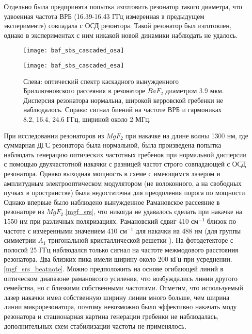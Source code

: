 Отдельно была предпринята попытка изготовить резонатор такого диаметра, что удвоенная частота ВРБ (16.39-16.43 ГГц измеренная в предыдущем эксперименте) совпадала с ОСД резонтора. Такой резонатор был изготовлен, однако в экспериментах с ним никакой новой динамики наблюдать не удалось.

\begin{figure}[ht]
\begin{minipage}[ht]{0.49\linewidth}\centering
    \texttt{[image: baf\_sbs\_cascaded\_osa]}
  \end{minipage}
  \hfill
  \begin{minipage}[ht]{0.49\linewidth}\centering
    \texttt{[image: baf\_sbs\_cascaded\_esa]}
  \end{minipage}
    \caption{Слева: оптический спектр каскадного вынужденного Бриллюэновского рассеяния в резонаторе $BaF_2$ диаметром 3.9 мкм. Дисперсия резонатора нормальна, широкой керровской гребенки не наблюдалось. Справа: сигнал биений на частоте ВРБ и гармониках 8.2, 16.4, 24.6 ГГц, шириной около 2 МГц.}
  \label{baf_sbs}
\end{figure}

При исследовании резонаторов из $MgF_2$ при накачке на длине волны 1300 нм, где суммарная ДГС резонатора была нормальной, была произведена попытка наблюдать генерацию оптических частотных гребенок при нормальной дисперсии с помощью двухчастотной накачки с разницей частот строго совпадающей с ОСД резонатора. Однако выходная мощность в схеме с имеющимся лазером и амплитудным электрооптическом модулятором (не волоконного, а на свободных пучках в пространстве) была недостаточна для преодоления порога по мощности. Однако впервые было наблюдено вынужденное Рамановское рассеяние в резонаторе из $MgF_2$ \ref{mgf_srs}, что никогда не удавалось сделать при накачке на 1550 нм при различных поляризациях. Рамановский сдвиг 410 см$^{-1}$ близок по частоте с измеренными значением 410 см$^{-1}$ для накачки на 488 нм (для группы симметрии $A_1$ тригональной кристаллической решетки \cite{PhysRev.154.522}). На фотодетекторе с полосой 25 ГГц наблюдался только сигнал на частоте межмодового расстояния резонатора. Два близких пика имели ширину около 200 кГц при усреднении. \ref{mgf_srs_beatnote}. Можно предположить на основе огибающей линий в оптическом диапазоне рамановсого усиления, что возбуждались линии другого семейства, но с близкими собственными частотами. Отметим, что используемый лазер накачки имел собственную ширину линии много больше, чем ширина линии микрорезонатора, поэтому невозможно было эффективно накачать моду резонатора и стационарная картина генерации гребенки не наблюдалась, дополнительных схем стабилизации частоты не применялось.

